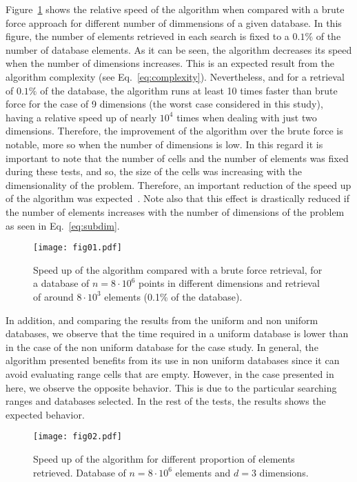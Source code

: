 \documentclass[review]{elsarticle}
\begin{document}
Figure~\ref{fig:dimensions} shows the relative speed of the algorithm when compared with a brute force approach for different number of dimmensions of a given database. In this figure, the number of elements retrieved in each search is fixed to a $0.1\%$ of the number of database elements. As it can be seen, the algorithm decreases its speed when the number of dimensions increases. This is an expected result from the algorithm complexity (see Eq.~\eqref{eq:complexity}). Nevertheless, and for a retrieval of $0.1\%$ of the database, the algorithm runs at least 10 times faster than brute force for the case of 9 dimensions (the worst case considered in this study), having a relative speed up of nearly $10^4$ times when dealing with just two dimensions. Therefore, the improvement of the algorithm over the brute force is notable, more so when the number of dimensions is low. In this regard it is important to note that the number of cells and the number of elements was fixed during these tests, and so, the size of the cells was increasing with the dimensionality of the problem. Therefore, an important reduction of the speed up of the algorithm was expected~\cite{dimension}. Note also that this effect is drastically reduced if the number of elements increases with the number of dimensions of the problem as seen in Eq.~\eqref{eq:subdim}.

\begin{figure}[h!]
	\centering
	\texttt{[image: fig01.pdf]}
	\caption{Speed up of the algorithm compared with a brute force retrieval, for a database of $n = 8\cdot 10^{6}$ points in different dimensions and retrieval of around $8\cdot 10^3$ elements (0.1\% of the database).}
	\label{fig:dimensions}
\end{figure}

In addition, and comparing the results from the uniform and non uniform databases, we observe that the time required in a uniform database is lower than in the case of the non uniform database for the case study. In general, the algorithm presented benefits from its use in non uniform databases since it can avoid evaluating range cells that are empty. However, in the case presented in here, we observe the opposite behavior. This is due to the particular searching ranges and databases selected. In the rest of the tests, the results shows the expected behavior.

\begin{figure}[h!]
	\centering
	\texttt{[image: fig02.pdf]}
	\caption{Speed up of the algorithm for different proportion of elements retrieved. Database of $n = 8\cdot 10^{6}$ elements and $d=3$ dimensions.}
	\label{fig:d3}
\end{figure}
\end{document}
